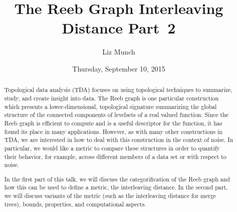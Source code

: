 \documentclass{UAmathtalk}
\author{Liz Munch}
\title{The Reeb Graph Interleaving Distance Part~2}
\date{Thursday, September 10, 2015}
\begin{document}
\maketitle

\begin{abstract}
Topological data analysis (TDA) focuses on using topological techniques to summarize, study, and create insight into data. The Reeb graph is one particular construction which presents a lower-dimensional, topological signature summarizing the global structure of the connected components of levelsets of a real valued function. Since the Reeb graph is efficient to compute and is a useful descriptor for the function, it has found its place in many applications.  However, as with many other constructions in TDA, we are interested in how to deal with this construction in the context of noise.  In particular, we would like a metric to compare these structures in order to quantify their behavior, for example, across different members of a data set or with respect to noise.

In the first part of this talk, we will discuss the categorification of the Reeb graph and how this can be used to define a metric, the interleaving distance.  In the second part, we will discuss variants of the metric (such as the interleaving distance for merge trees), bounds, properties, and computational aspects.
\end{abstract}
\end{document}

